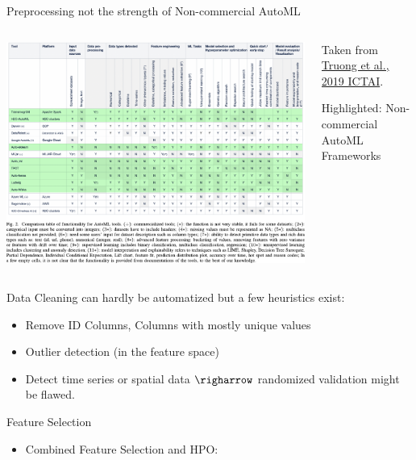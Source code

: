 \begin{frame}{Preprocessing not the strength of Non-commercial AutoML}
  \begin{columns}
    \begin{column}{0.6\textwidth}
      \vspace*{-1cm}
      \begin{center}
        \includegraphics[width = \linewidth]{images/Truong2019Towards_fig2.pdf}
      \end{center}
    \end{column}%
    \begin{column}{0.3\textwidth}
    \small
      Taken from \href{https://doi.org/10.1109/ICTAI.2019.00209}{Truong et al., 2019 ICTAI}.
      \vspace{1em}

      Highlighted: Non-commercial AutoML Frameworks
    \end{column}
  \end{columns}
\end{frame}

\begin{frame}{}
    Data Cleaning can hardly be automatized but a few heuristics exist:
    \begin{itemize}
      \item Remove ID Columns, Columns with mostly unique values
      \item Outlier detection (in the feature space)
      \item Detect time series or spatial data $\righarrow$ randomized validation might be flawed.
    \end{itemize}

    Feature Selection
    \begin{itemize}
      \item Combined Feature Selection and HPO: 
    \end{itemize}
\end{frame}

